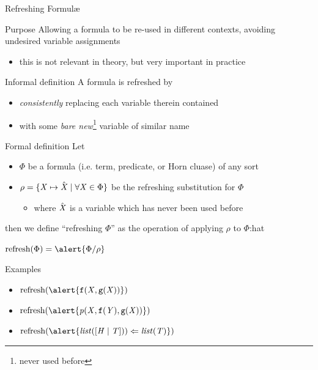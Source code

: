 \documentclass[presentation]{beamer}\mode<presentation>{\usetheme{AMSBolognaFC}}
\begin{document}
\begin{frame}[allowframebreaks]{Refreshing Formul\ae{}}
    \begin{block}{Purpose}
        Allowing a formula to be re-used in different contexts, avoiding undesired variable assignments 
		\begin{itemize}
			\item this is not relevant in theory, but very important in practice
		\end{itemize}
    \end{block}
    \begin{block}{Informal definition}
        A formula is \alert{refreshed} by 
		\begin{itemize}
			\item \emph{consistently} replacing each variable therein contained
			\item with some \emph{bare new}\footnote{never used before} variable of similar name 
		\end{itemize}
    \end{block}
    \begin{alertblock}{Formal definition}
		Let 
		\begin{itemize}
			\item \alert{$\Phi$} be a formula (i.e. term, predicate, or Horn cluase) of any sort 
			\item \alert{$\rho = \{ \mathit{X} \mapsto \hat{\mathit{X}} \mid \forall \mathit{X} \in \Phi \}$} be the refreshing substitution for $\Phi$
			\begin{itemize}\small
				\item where $\hat{\mathit{X}}$ is a variable which has \alert{never been used before}
			\end{itemize} 
		\end{itemize}
		then we define ``refreshing $\Phi$'' as the operation of applying $\rho$ to $\Phi$:hat
		\begin{center}
			$ \text{refresh}(\Phi) = \alert{\Phi / \rho} $
		\end{center}
    \end{alertblock}

    \begin{exampleblock}{Examples}
        \begin{multicols}{2}\small
			\begin{itemize}
				\item $\text{refresh}(\alert{\functor{f}(\variable{X}, \functor{g}(\variable{X}))})$ 
				\item $\text{refresh}(\alert{\predication{p}(\variable{X}, \functor{f}(\variable{Y}), \functor{g}(\variable{X}))})$ 
				\item $\text{refresh}(\alert{\predication{list}([\variable{H} \mid \variable{T} ])) \Leftarrow \predication{list}(\variable{T})})$ 
				

\end{itemize}
\end{multicols}
\end{exampleblock}
\end{frame}
\end{document}
